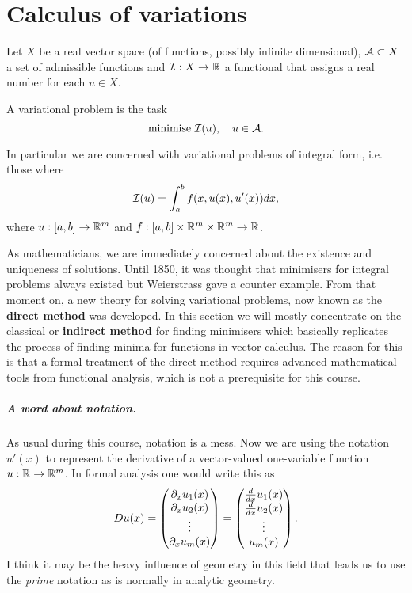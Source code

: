 \chapter{Calculus of variations}

\begin{dfn}

  Let $X$ be a real vector space (of functions, possibly infinite dimensional),
  $\mathcal{A} \subset X$ a set of admissible functions and $\mathcal{I} : X \to \mathbb{R}$ a
  functional that assigns a real number for each $u \in X$.

  A variational problem is the task
  \[
    \text{minimise } \mathcal{I}(u),\quad u \in \mathcal{A}.
  \]
\end{dfn}

In particular we are concerned with variational problems of integral form, i.e.
those where
\begin{align}
  \label{eq:cv-integral}
  \mathcal{I}(u) = \int_a^b f(x, u(x), u'(x))dx,
\end{align}
where $u : [a, b] \to \mathbb{R}^m$ and $f: [a,b] \times \mathbb{R}^m \times \mathbb{R}^m \to \mathbb{R}$.

As mathematicians, we are immediately concerned about the existence and
uniqueness of solutions. Until 1850, it was thought that minimisers for
integral problems always existed but Weierstrass gave a counter example. From
that moment on, a new theory for solving variational problems, now known as the
\textbf{direct method} was developed. In this section we will mostly
concentrate on the classical or \textbf{indirect method} for finding minimisers
which basically replicates the process of finding minima for functions in
vector calculus. The reason for this is that a formal treatment of the direct
method requires advanced mathematical tools from functional analysis, which is
not a prerequisite for this course.

\paragraph{A word about notation.} As usual during this course, notation is a
mess. Now we are using the notation $u'(x)$ to represent the derivative of a
vector-valued one-variable function $u : \mathbb{R} \to \mathbb{R}^m$. In formal analysis one
would write this as
\[
  Du(x) =
  \begin{pmatrix}
    \partial_x u_1(x) \\
    \partial_x u_2(x) \\
    \vdots \\
    \partial_x u_m(x)
  \end{pmatrix} =
  \begin{pmatrix}
    \frac{d}{dx} u_1(x) \\ \frac{d}{dx} u_2(x) \\ \vdots \\ u_m(x)
  \end{pmatrix}.
\]
I think it may be the heavy influence of geometry in this field that leads us
to use the \textit{prime} notation as is normally in analytic geometry.

